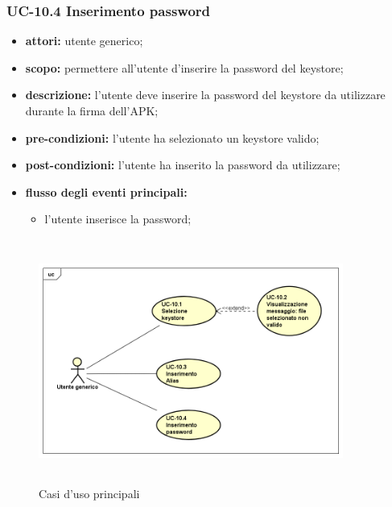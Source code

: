 \subsubsection{UC-10.4 Inserimento password}
\begin{itemize}
    \item \textbf{attori:} utente generico;
    \item \textbf{scopo:} permettere all'utente d'inserire la password del keystore;
    \item \textbf{descrizione:} l'utente deve inserire la password del keystore da utilizzare durante la firma dell'APK;
    \item \textbf{pre-condizioni:} l'utente ha selezionato un keystore valido;
    \item \textbf{post-condizioni:} l'utente ha inserito la password da utilizzare;
    \item \textbf{flusso degli eventi principali:}
    \begin{itemize}
        \item l'utente inserisce la password;
    \end{itemize}
\end{itemize}
\begin{figure}[!h]
    \centering
    \includegraphics[width=10cm, height=8cm]{./immagini/usecase/uc_10.png}
    \caption{Casi d'uso principali}
\end{figure}

